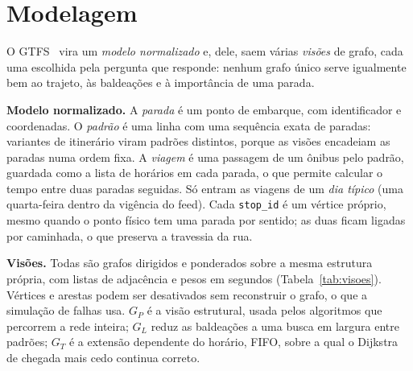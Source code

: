 \section{Modelagem}\label{sec:modelagem}

O GTFS~\cite{gtfs-reference} vira um \emph{modelo normalizado} e, dele, saem várias
\emph{visões} de grafo, cada uma escolhida pela pergunta que responde: nenhum grafo único serve
igualmente bem ao trajeto, às baldeações e à importância de uma parada.

\textbf{Modelo normalizado.} A \emph{parada} é um ponto de embarque, com identificador e
coordenadas. O \emph{padrão} é uma linha com uma sequência exata de paradas: variantes de
itinerário viram padrões distintos, porque as visões encadeiam as paradas numa ordem fixa. A
\emph{viagem} é uma passagem de um ônibus pelo padrão, guardada como a lista de horários em
cada parada, o que permite calcular o tempo entre duas paradas seguidas. Só entram as viagens de
um \emph{dia típico} (uma quarta-feira dentro da vigência do feed). Cada \texttt{stop\_id} é um
vértice próprio, mesmo quando o ponto físico tem uma parada por sentido; as duas ficam ligadas
por caminhada, o que preserva a travessia da rua.

\textbf{Visões.} Todas são grafos dirigidos e ponderados sobre a mesma estrutura própria, com
listas de adjacência e pesos em segundos (Tabela~\ref{tab:visoes}). Vértices e arestas podem ser
desativados sem reconstruir o grafo, o que a simulação de falhas usa. $G_P$ é a visão
estrutural, usada pelos algoritmos que percorrem a rede inteira; $G_L$ reduz as baldeações a uma
busca em largura entre padrões; $G_T$ é a extensão dependente do horário, FIFO, sobre a qual o
Dijkstra de chegada mais cedo continua correto.

